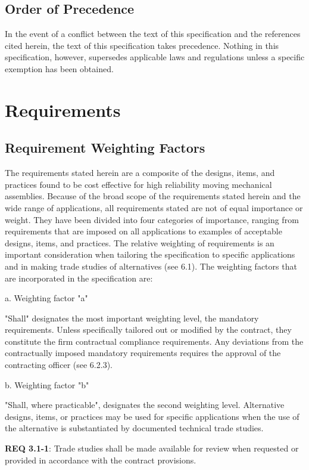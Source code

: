 \documentclass[12pt]{article}
\begin{document}
\subsection{Order of Precedence} %
In the event of a conflict between the text of this specification and the references cited herein, the text of this specification takes precedence. 
Nothing in this specification, however, supersedes applicable laws and regulations unless a specific exemption has been obtained.

\section{Requirements} %

\subsection{Requirement Weighting Factors} %
The requirements stated herein are a composite of the designs, items, and practices found to be cost effective for high reliability moving mechanical assemblies. 
Because of the broad scope of the requirements stated herein and the wide range of applications, all requirements stated are not of equal importance or weight. 
They have been divided into four categories of importance, ranging from requirements that are imposed on all applications to examples of acceptable designs, items, and practices. 
The relative weighting of requirements is an important consideration when tailoring the specification to specific applications and in making trade studies of alternatives (see 6.1). 
The weighting factors that are incorporated in the specification are:

a. Weighting factor "a" 

"Shall" designates the most important weighting level, the mandatory requirements. 
Unless specifically tailored out or modified by the contract, they constitute the firm contractual compliance requirements. 
Any deviations from the contractually imposed mandatory requirements requires the approval of the contracting officer (see 6.2.3).

b. Weighting factor "b" 

"Shall, where practicable", designates the second weighting level. 
Alternative designs, items, or practices may be used for specific applications when the use of the alternative is substantiated by documented technical trade studies.
 
\noindent \textbf{REQ 3.1-1}: Trade studies shall be made available for review when requested or provided in accordance with the contract provisions. 
\end{document}
